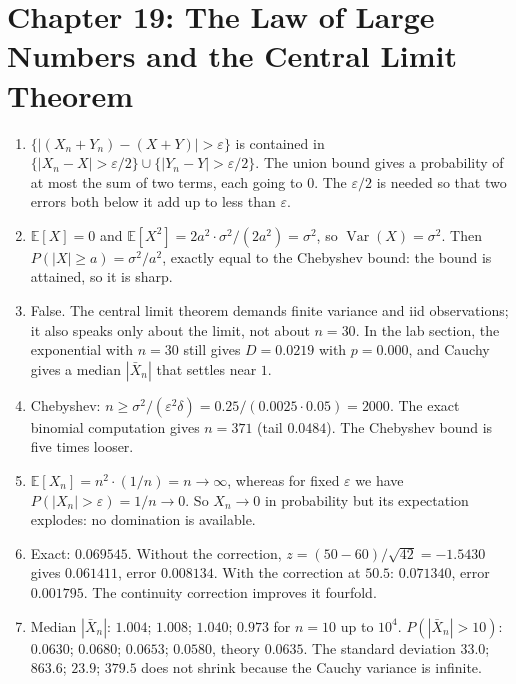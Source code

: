 \section*{Chapter 19: The Law of Large Numbers and the Central Limit Theorem}
\begin{enumerate}[label=\textbf{19.\arabic*}]
  \item $\{|(X_{n}+Y_{n})-(X+Y)|>\varepsilon\}$ is contained in
        $\{|X_{n}-X|>\varepsilon/2\}\cup\{|Y_{n}-Y|>\varepsilon/2\}$. The union bound
        gives a probability of at most the sum of two terms, each going to $0$.
        The $\varepsilon/2$ is needed so that two errors both below it add up to
        less than $\varepsilon$.

  \item $\mathbb{E}[X]=0$ and $\mathbb{E}[X^{2}]=2a^{2}\cdot\sigma^{2}/(2a^{2})=\sigma^{2}$,
        so $\operatorname{Var}(X)=\sigma^{2}$. Then
        $P(|X|\ge a)=\sigma^{2}/a^{2}$, exactly equal to the Chebyshev bound: the bound
        is attained, so it is sharp.

  \item False. The central limit theorem demands finite variance and iid observations; it
        also speaks only about the limit, not about $n=30$. In the lab section, the
        exponential with $n=30$ still gives $D=0.0219$ with $p=0.000$, and Cauchy
        gives a median $|\bar X_{n}|$ that settles near $1$.

  \item Chebyshev: $n\ge\sigma^{2}/(\varepsilon^{2}\delta)=0.25/(0.0025\cdot0.05)
        =2000$. The exact binomial computation gives $n=371$ (tail $0.0484$). The
        Chebyshev bound is five times looser.

  \item $\mathbb{E}[X_{n}]=n^{2}\cdot(1/n)=n\to\infty$, whereas for fixed
        $\varepsilon$ we have $P(|X_{n}|>\varepsilon)=1/n\to0$. So $X_{n}\to0$ in
        probability but its expectation explodes: no domination is available.

  \item Exact: $0.069545$. Without the correction, $z=(50-60)/\sqrt{42}=-1.5430$ gives
        $0.061411$, error $0.008134$. With the correction at $50.5$:
        $0.071340$, error $0.001795$. The continuity correction improves it fourfold.

  \item Median $|\bar X_{n}|$: $1.004$; $1.008$; $1.040$; $0.973$ for
        $n=10$ up to $10^{4}$. $P(|\bar X_{n}|>10)$: $0.0630$; $0.0680$;
        $0.0653$; $0.0580$, theory $0.0635$. The standard deviation $33.0$; $863.6$;
        $23.9$; $379.5$ does not shrink because the Cauchy variance is infinite.


\end{enumerate}
